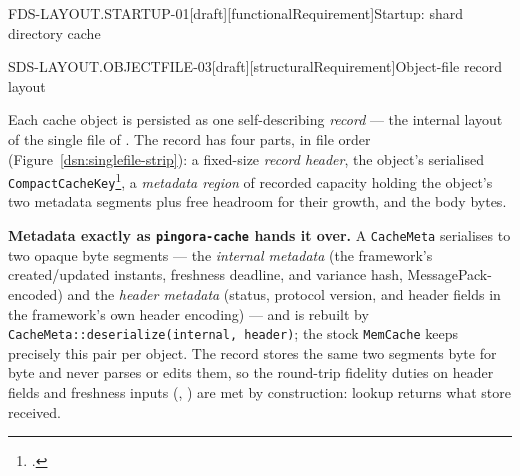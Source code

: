 \begin{requirement}{FDS-LAYOUT.STARTUP-01}[draft][functionalRequirement]{Startup: shard directory cache}


\end{requirement}

\begin{requirement}{SDS-LAYOUT.OBJECTFILE-03}[draft][structuralRequirement]{Object-file record layout}


  Each cache object is persisted as one self-describing \emph{record} --- the
  internal layout of the single file of . The
  record has four parts, in file order
  (Figure~\ref{dsn:singlefile-strip}): a fixed-size \emph{record header}, the
  object's serialised
  \texttt{CompactCacheKey}\footnote{.},
  a \emph{metadata region} of
  recorded capacity holding the object's two metadata segments plus free
  headroom for their growth, and the body bytes.

  \textbf{Metadata exactly as \texttt{pingora-cache} hands it over.} A
  \texttt{CacheMeta} serialises to two opaque byte segments --- the
  \emph{internal metadata} (the framework's created/updated instants,
  freshness deadline, and variance hash, MessagePack-encoded) and the
  \emph{header metadata} (status, protocol version, and header fields in the
  framework's own header encoding) --- and is rebuilt by
  \texttt{CacheMeta::deserialize(internal, header)}; the stock
  \texttt{MemCache} keeps precisely this pair per object. The record stores
  the same two segments byte for byte and never parses or edits them, so the
  round-trip fidelity duties on header fields and freshness inputs
  (, )
  are met by construction: lookup returns what store received.


\end{requirement}
